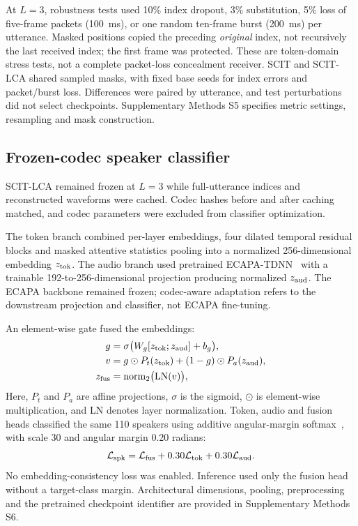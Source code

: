 \documentclass[final,5p,times,twocolumn]{elsarticle}
\begin{document}
At $L=3$, robustness tests used 10\% index dropout, 3\% substitution, 5\% loss of five-frame packets (100~ms), or one random ten-frame burst (200~ms) per utterance. Masked positions copied the preceding \emph{original} index, not recursively the last received index; the first frame was protected. These are token-domain stress tests, not a complete packet-loss concealment receiver. SCIT and SCIT-LCA shared sampled masks, with fixed base seeds for index errors and packet/burst loss. Differences were paired by utterance, and test perturbations did not select checkpoints. Supplementary Methods S5 specifies metric settings, resampling and mask construction.

\subsection{Frozen-codec speaker classifier}
SCIT-LCA remained frozen at $L=3$ while full-utterance indices and reconstructed waveforms were cached. Codec hashes before and after caching matched, and codec parameters were excluded from classifier optimization.

The token branch combined per-layer embeddings, four dilated temporal residual blocks and masked attentive statistics pooling into a normalized 256-dimensional embedding $z_{\rm tok}$. The audio branch used pretrained ECAPA-TDNN~\cite{ecapa} with a trainable 192-to-256-dimensional projection producing normalized $z_{\rm aud}$. The ECAPA backbone remained frozen; codec-aware adaptation refers to the downstream projection and classifier, not ECAPA fine-tuning.

An element-wise gate fused the embeddings:
\begin{equation}
\begin{aligned}
 g&=\sigma\bigl(W_g[z_{\rm tok};z_{\rm aud}]+b_g\bigr),\\
 v&=g\odot P_t(z_{\rm tok})+(1-g)\odot P_a(z_{\rm aud}),\\
 z_{\rm fus}&=\operatorname{norm}_2\bigl(\operatorname{LN}(v)\bigr),
\end{aligned}
\end{equation}
Here, $P_t$ and $P_a$ are affine projections, $\sigma$ is the sigmoid, $\odot$ is element-wise multiplication, and LN denotes layer normalization. Token, audio and fusion heads classified the same 110 speakers using additive angular-margin softmax~\cite{arcface}, with scale 30 and angular margin 0.20 radians:
\begin{equation}
 \mathcal L_{\rm spk}
 =\mathcal L_{\rm fus}
  +0.30\mathcal L_{\rm tok}
  +0.30\mathcal L_{\rm aud}.
\end{equation}
No embedding-consistency loss was enabled. Inference used only the fusion head without a target-class margin. Architectural dimensions, pooling, preprocessing and the pretrained checkpoint identifier are provided in Supplementary Methods S6.
\end{document}
